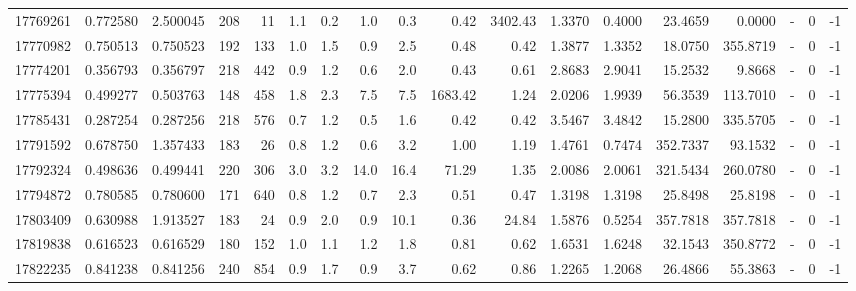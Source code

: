 \begin{tabular}{rrrrrrrrrrrrrrrlrr}
  17769261 & 0.772580 &   2.500045 &  208 &   11 &      1.1 &      0.2 &     1.0 &      0.3 &       0.42 &     3402.43 &  1.3370 &  0.4000 &   23.4659 &    0.0000 &             - &        0 &         -1 \\
  17770982 & 0.750513 &   0.750523 &  192 &  133 &      1.0 &      1.5 &     0.9 &      2.5 &       0.48 &        0.42 &  1.3877 &  1.3352 &   18.0750 &  355.8719 &             - &        0 &         -1 \\
  17774201 & 0.356793 &   0.356797 &  218 &  442 &      0.9 &      1.2 &     0.6 &      2.0 &       0.43 &        0.61 &  2.8683 &  2.9041 &   15.2532 &    9.8668 &             - &        0 &         -1 \\
  17775394 & 0.499277 &   0.503763 &  148 &  458 &      1.8 &      2.3 &     7.5 &      7.5 &    1683.42 &        1.24 &  2.0206 &  1.9939 &   56.3539 &  113.7010 &             - &        0 &         -1 \\
  17785431 & 0.287254 &   0.287256 &  218 &  576 &      0.7 &      1.2 &     0.5 &      1.6 &       0.42 &        0.42 &  3.5467 &  3.4842 &   15.2800 &  335.5705 &             - &        0 &         -1 \\
  17791592 & 0.678750 &   1.357433 &  183 &   26 &      0.8 &      1.2 &     0.6 &      3.2 &       1.00 &        1.19 &  1.4761 &  0.7474 &  352.7337 &   93.1532 &             - &        0 &         -1 \\
  17792324 & 0.498636 &   0.499441 &  220 &  306 &      3.0 &      3.2 &    14.0 &     16.4 &      71.29 &        1.35 &  2.0086 &  2.0061 &  321.5434 &  260.0780 &             - &        0 &         -1 \\
  17794872 & 0.780585 &   0.780600 &  171 &  640 &      0.8 &      1.2 &     0.7 &      2.3 &       0.51 &        0.47 &  1.3198 &  1.3198 &   25.8498 &   25.8198 &             - &        0 &         -1 \\
  17803409 & 0.630988 &   1.913527 &  183 &   24 &      0.9 &      2.0 &     0.9 &     10.1 &       0.36 &       24.84 &  1.5876 &  0.5254 &  357.7818 &  357.7818 &             - &        0 &         -1 \\
  17819838 & 0.616523 &   0.616529 &  180 &  152 &      1.0 &      1.1 &     1.2 &      1.8 &       0.81 &        0.62 &  1.6531 &  1.6248 &   32.1543 &  350.8772 &             - &        0 &         -1 \\
  17822235 & 0.841238 &   0.841256 &  240 &  854 &      0.9 &      1.7 &     0.9 &      3.7 &       0.62 &        0.86 &  1.2265 &  1.2068 &   26.4866 &   55.3863 &             - &        0 &         -1 \\

\end{tabular}
